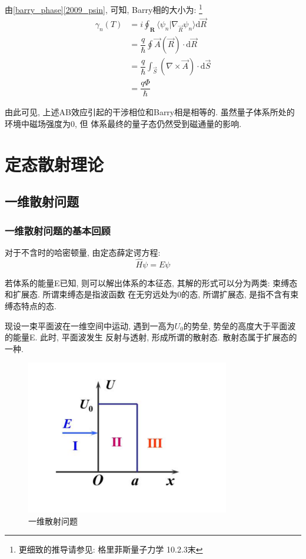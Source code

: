 \documentclass[a4paper, 11pt]{article}
\begin{document}
\begin{spacing}{1.2}
        由\eqref{barry_phase}\eqref{2009_psin}, 可知, Barry相的大小为:
        \footnote{更细致的推导请参见: 格里菲斯量子力学 10.2.3末}
        \begin{equation}
          \begin{aligned}
           \gamma_n(T) &= i\oint_\mathbf{R}\langle\psi_n|\nabla_{\vec{R}}\psi_n\rangle\mathrm{d}\vec{R}\\
                       &= \dfrac{q}{\hbar}\oint\vec{A}(\vec{R})\cdot\mathrm{d}\vec{R}\\
                       &= \dfrac{q}{\hbar}\int_{\vec{S}}(\nabla\times\vec{A})\cdot\mathrm{d}\vec{S}\\
                       &= \dfrac{q\Phi}{\hbar}
          \end{aligned}
        \end{equation}

        由此可见, 上述AB效应引起的干涉相位和Barry相是相等的. 虽然量子体系所处的环境中磁场强度为0, 但
        体系最终的量子态仍然受到磁通量的影响.

   \section{定态散射理论}
      \subsection{一维散射问题}
        \subsubsection{一维散射问题的基本回顾}
          对于不含时的哈密顿量, 由定态薛定谔方程: 
          \begin{equation}
            \hat{H}\psi = E\psi
          \end{equation}
        
          若体系的能量E已知, 则可以解出体系的本征态, 其解的形式可以分为两类: 束缚态和扩展态. 所谓束缚态是指波函数
          在无穷远处为0的态, 所谓扩展态, 是指不含有束缚态特点的态.
          
          现设一束平面波在一维空间中运动, 遇到一高为$U_0$的势垒, 势垒的高度大于平面波的能量E. 此时, 平面波发生
          反射与透射, 形成所谓的散射态. 散射态属于扩展态的一种. 

          \begin{figure}
            \centering\includegraphics[width=3.5in]{image/scattering_state}
            \caption{一维散射问题}\label{1D_scatering} 
          \end{figure}


\end{spacing}
\end{document}
